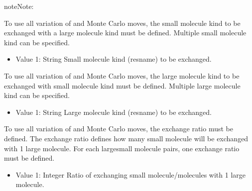 \documentclass[letterpaper,10pt,english]{sphinxmanual}
\begin{document}
\begin{description}
\begin{sphinxadmonition}{note}{Note:}
\begin{itemize}
\end{itemize}
\end{sphinxadmonition}

\item[{\sphinxcode{\sphinxupquote{ExchangeSmallKind}}}] \leavevmode
\sphinxAtStartPar
To use all variation of  and  Monte Carlo moves, the small molecule kind to be exchanged with a large molecule kind must be defined. Multiple small molecule kind can be specified.
\begin{itemize}
\item {} 
\sphinxAtStartPar
Value 1: String \sphinxhyphen{} Small molecule kind (resname) to be exchanged.

\end{itemize}

\item[{\sphinxcode{\sphinxupquote{ExchangeLargeKind}}}] \leavevmode
\sphinxAtStartPar
To use all variation of  and  Monte Carlo moves, the large molecule kind to be exchanged with small molecule kind must be defined. Multiple large molecule kind can be specified.
\begin{itemize}
\item {} 
\sphinxAtStartPar
Value 1: String \sphinxhyphen{} Large molecule kind (resname) to be exchanged.

\end{itemize}

\item[{\sphinxcode{\sphinxupquote{ExchangeRatio}}}] \leavevmode
\sphinxAtStartPar
To use all variation of  and  Monte Carlo moves, the exchange ratio must be defined. The exchange ratio defines how many small molecule will be exchanged with 1 large molecule. For each large\sphinxhyphen{}small molecule pairs, one exchange ratio must be defined.
\begin{itemize}
\item {} 
\sphinxAtStartPar
Value 1: Integer \sphinxhyphen{} Ratio of exchanging small molecule/molecules with 1 large molecule.

\end{itemize}


\end{description}
\end{document}
